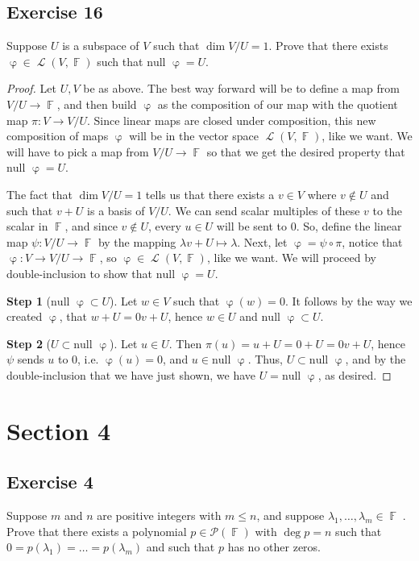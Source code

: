 \documentclass[letterpaper, 12pt]{amsart}
\DeclareMathOperator{\F}{\mathbb{F}}				%
\DeclareMathOperator{\Ell}{\mathscr{L}}				%
\DeclareMathOperator{\ph}{\varphi}					%
\renewcommand{\null}{\text{null }}					%
\theoremstyle{definition}  							%
\begin{document}
		\subsection*{Exercise 16}
		Suppose $U$ is a subspace of $V$ such that $\dim V/U = 1$. 
		Prove that there exists $\ph \in \Ell(V, \F)$ such that $\null \ph = U$.

		\begin{proof}
		Let $U,V$ be as above.
		The best way forward will be to define a map from $V/U \to \F$, and then build $\ph$ as the composition of our map with the quotient map $\pi : V \to V/U$.
		Since linear maps are closed under composition, this new composition of maps $\ph$ will be in the vector space $\Ell(V, \F)$, like we want.
		We will have to pick a map from $V/U \to \F$ so that we get the desired property that $\null \ph = U$.

		The fact that $\dim V/U = 1$ tells us that there exists a $v \in V$ where $v \notin U$ and such that $v + U$ is a basis of $V/U$.
		We can send scalar multiples of these $v$ to the scalar in $\F$, and since $v \notin U$, every $u \in U$ will be sent to $0$.
		So, define the linear map $\psi : V/U \to \F$ by the mapping $\lambda v + U \mapsto \lambda$.
		Next, let $\ph = \psi \circ \pi$, notice that $\ph : V \to V/U \to \F$, so $\ph \in \Ell(V,\F)$, like we want.
		We will proceed by double-inclusion to show that $\null \ph = U$.

		\textbf{Step 1} ($\null \ph \subset U$).
		Let $w \in V$ such that $\ph(w) = 0$.
		It follows by the way we created $\ph$, that $w + U = 0v + U$, hence $w \in U$ and $\null \ph \subset U$.

		\textbf{Step 2} ($U \subset \null \ph$).
		Let $u \in U$.
		Then $\pi(u) = u + U = 0 + U = 0v + U$, hence $\psi$ sends $u$ to $0$, i.e. $\ph(u) = 0$, and $u \in \null \ph$.
		Thus, $U \subset \null \ph$, and by the double-inclusion that we have just shown, we have $U = \null \ph$, as desired.
		\end{proof}

	\section*{Section 4}
		\subsection*{Exercise 4}
		Suppose $m$ and $n$ are positive integers with $m \leq n$, and suppose $\lambda_{1}, \dots, \lambda_{m} \in \F$􏰃. 
		Prove that there exists a polynomial $p \in \mathcal{P}(\F)$ with $\deg p = n$ such that $0 = p(\lambda_{1}) = \dots = p(\lambda_{m})$ and such that $p$ has no other zeros.
\end{document}
